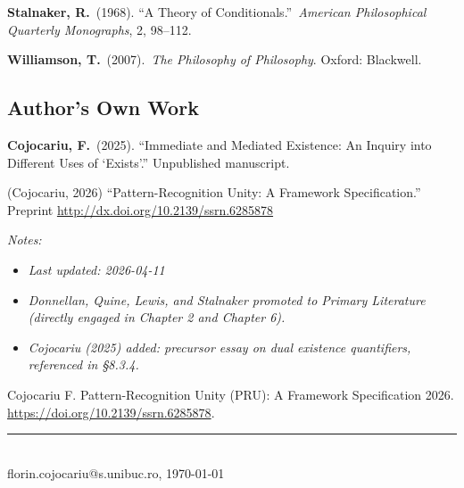 \documentclass[12pt,a4paper]{article}
\newlength{\cslhangindent}
\newenvironment{CSLReferences}[2]%
  {\begin{enumerate}[label={[\arabic*]},leftmargin=\cslhangindent,itemsep=0pt]%
   \raggedright\sloppy
   \renewcommand{\bibitem}[2][]{\item}}%
  {\end{enumerate}}
\providecommand{\tightlist}{}
\providecommand{\citeproctext}{}
\begin{document}
\textbf{Stalnaker, R.}~(1968). ``A Theory of Conditionals.''~\emph{American Philosophical Quarterly Monographs}, 2, 98--112.

\textbf{Williamson, T.}~(2007).~\emph{The Philosophy of Philosophy}. Oxford: Blackwell.

\subsection{Author's Own Work}\label{authors-own-work}

\textbf{Cojocariu, F.}~(2025). ``Immediate and Mediated Existence: An Inquiry into Different Uses of `Exists'.'' Unpublished manuscript.

(Cojocariu, 2026) ``Pattern-Recognition Unity: A Framework Specification.'' Preprint \href{https://dx.doi.org/10.2139/ssrn.6285878}{http://dx.doi.org/10.2139/ssrn.6285878}

\emph{Notes:}

\begin{itemize}
\tightlist
\item
  \emph{Last updated: 2026-04-11}
\item
  \emph{Donnellan, Quine, Lewis, and Stalnaker promoted to Primary Literature (directly engaged in Chapter 2 and Chapter 6).}
\item
  \emph{Cojocariu (2025) added: precursor essay on dual existence quantifiers, referenced in §8.3.4.}
\end{itemize}

\protect{}\label{refs}
\begin{CSLReferences}{0}{0}
\bibitem[\citeproctext]{ref-cojocariuPatternRecognitionUnityPRU}
Cojocariu F. Pattern-Recognition Unity (PRU): A Framework Specification 2026. \url{https://doi.org/10.2139/ssrn.6285878}.

\end{CSLReferences}

\vfill
\noindent\rule{\textwidth}{0.4pt}\\[2pt]
{\tiny florin.cojocariu@s.unibuc.ro, \today}
\end{document}
